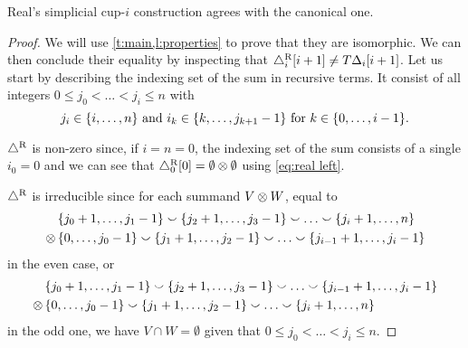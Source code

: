 \begin{theorem}
	Real's simplicial \mbox{cup-$i$} construction agrees with the canonical one.
\end{theorem}

\begin{proof}
	We will use \cref{t:main,l:properties} to prove that they are isomorphic.
	We can then conclude their equality by inspecting that $\triangle^{\mathrm{R}}_i [i+1] \neq T \Delta_i [i+1]$.
	Let us start by describing the indexing set of the sum in recursive terms.
	It consist of all integers $0 \leq j_0 < \dots < j_i \leq n$ with
	\begin{equation}\label{eq:indexing set recursively}
		j_i \in \{i,\dots,n\} \text{ and }
		i_k \in \{k,\dots,j_{k+1}-1\} \text{ for } k \in \{0,\dots,i-1\}.
	\end{equation}

	$\triangle^{\mathrm{R}}$ is non-zero since, if $i=n=0$, the indexing set of the sum consists of a single $i_0 = 0$ and we can see that $\triangle^{\mathrm{R}}_0 [0] = \emptyset \otimes \emptyset$ using \cref{eq:real left}.

	$\triangle^{\mathrm{R}}$ is irreducible since for each summand $V \otimes W$, equal to
	\begin{align*}
		&\{j_0+1,\dots,j_1-1\} \union \{j_2+1,\dots,j_3-1\} \union \dots \union \{j_i+1,\dots,n\} \\ \ot \,
		&\{0,\dots,j_0-1\} \union \{j_1+1,\dots,j_2-1\} \union \dots \union \{j_{i-1}+1,\dots,j_i-1\}
	\end{align*}
	in the even case, or
	\begin{align*}
		&\{j_0+1,\dots,j_1-1\} \union \{j_2+1,\dots,j_3-1\} \union \dots \union \{j_{i-1}+1,\dots,j_i-1\} \\ \ot \,
		&\{0,\dots,j_0-1\} \union \{j_1+1,\dots,j_2-1\} \union \dots \union \{j_i+1,\dots,n\}
	\end{align*}
	in the odd one, we have $V \cap W = \emptyset$ given that $0 \leq j_0 < \dots < j_i \leq n$.


\end{proof}

